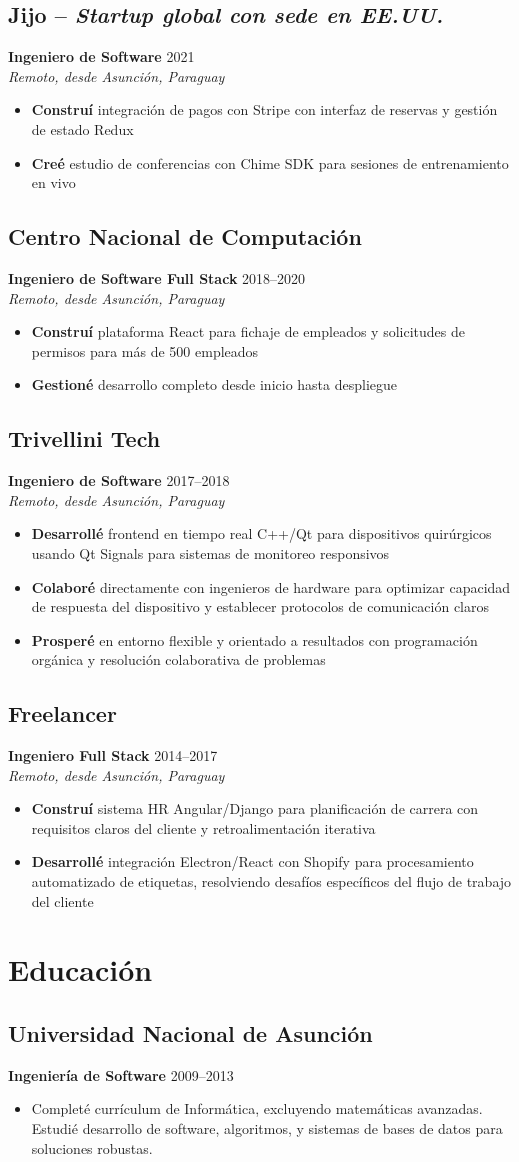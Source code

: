 \documentclass[11pt,a4paper]{article}
\newcommand{\actionverb}[1]{\textcolor{actioncolor}{\textbf{#1}}}
\newcommand{\cvcompany}[3]{
  \subsection{#1 \textcolor{mediumgray}{#2}}
  #3
  \vspace{0.5em}
}
\newcommand{\cvrole}[4]{
  \textbf{#1} \hfill \textcolor{mediumgray}{\small #2}\\
  \textit{#3}
  \begin{itemize}
    #4
  \end{itemize}
  \vspace{1em}
}
\newcommand{\cveducation}[4]{
  \subsection{#1}
  \textbf{#2} \hfill \textcolor{mediumgray}{\small #3}
  \begin{itemize}
    \item #4
  \end{itemize}
}
\begin{document}
\cvcompany{Jijo}{-- \textit{Startup global con sede en EE.UU.}}{
  \cvrole{Ingeniero de Software}{2021}{Remoto, desde Asunción, Paraguay}{
    \item \actionverb{Construí} integración de pagos con Stripe con interfaz de reservas y gestión de estado Redux
    \item \actionverb{Creé} estudio de conferencias con Chime SDK para sesiones de entrenamiento en vivo
  }
}

\cvcompany{Centro Nacional de Computación}{}{
  \cvrole{Ingeniero de Software Full Stack}{2018--2020}{Remoto, desde Asunción, Paraguay}{
    \item \actionverb{Construí} plataforma React para fichaje de empleados y solicitudes de permisos para más de 500 empleados
    \item \actionverb{Gestioné} desarrollo completo desde inicio hasta despliegue
  }
}

\cvcompany{Trivellini Tech}{}{
  \cvrole{Ingeniero de Software}{2017--2018}{Remoto, desde Asunción, Paraguay}{
    \item \actionverb{Desarrollé} frontend en tiempo real C++/Qt para dispositivos quirúrgicos usando Qt Signals para sistemas de monitoreo responsivos
    \item \actionverb{Colaboré} directamente con ingenieros de hardware para optimizar capacidad de respuesta del dispositivo y establecer protocolos de comunicación claros
    \item \actionverb{Prosperé} en entorno flexible y orientado a resultados con programación orgánica y resolución colaborativa de problemas
  }
}

\cvcompany{Freelancer}{}{
  \cvrole{Ingeniero Full Stack}{2014--2017}{Remoto, desde Asunción, Paraguay}{
    \item \actionverb{Construí} sistema HR Angular/Django para planificación de carrera con requisitos claros del cliente y retroalimentación iterativa
    \item \actionverb{Desarrollé} integración Electron/React con Shopify para procesamiento automatizado de etiquetas, resolviendo desafíos específicos del flujo de trabajo del cliente
  }
}

\section{Educación}

\cveducation{Universidad Nacional de Asunción}{Ingeniería de Software}{2009--2013}{Completé currículum de Informática, excluyendo matemáticas avanzadas. Estudié desarrollo de software, algoritmos, y sistemas de bases de datos para soluciones robustas.}
\end{document}
